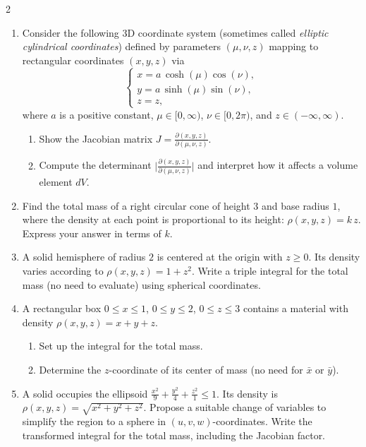 \begin{multicols}{2}
\begin{enumerate}
\item Consider the following 3D coordinate system (sometimes called \emph{elliptic cylindrical coordinates}) defined by parameters \((\mu,\nu,z)\) mapping to rectangular coordinates \((x,y,z)\) via
\[
\begin{cases}
x = a\,\cosh(\mu)\cos(\nu),\\
y = a\,\sinh(\mu)\sin(\nu),\\
z = z,
\end{cases}
\]
where \(a\) is a positive constant, \(\mu \in [0,\infty)\), \(\nu \in [0,2\pi)\), and \(z\in(-\infty,\infty)\).

\begin{enumerate}
\item Show the Jacobian matrix \(\displaystyle J = \frac{\partial(x,y,z)}{\partial(\mu,\nu,z)}\).
\item Compute the determinant \(\bigl|\tfrac{\partial(x,y,z)}{\partial(\mu,\nu,z)}\bigr|\) and interpret how it affects a volume element \(dV\).
\end{enumerate}

\item 
Find the total mass of a right circular cone of height $3$ and base radius $1$, where the density at each point is proportional to its height: $\rho(x,y,z) = k \,z$. Express your answer in terms of $k$.

\item 
A solid hemisphere of radius $2$ is centered at the origin with $z \ge 0$. Its density varies according to $\rho(x,y,z)=1+z^2$. Write a triple integral for the total mass (no need to evaluate) using spherical coordinates.

\item 
A rectangular box $0 \le x \le 1$, $0 \le y \le 2$, $0 \le z \le 3$ contains a material with density $\rho(x,y,z)=x+y+z$.  
\begin{enumerate}
   \item Set up the integral for the total mass.  
   \item Determine the $z$-coordinate of its center of mass (no need for $\bar{x}$ or $\bar{y}$).
\end{enumerate}

\item 
A solid occupies the ellipsoid $\frac{x^2}{9} + \frac{y^2}{4} + \frac{z^2}{1} \le 1$. Its density is $\rho(x,y,z) = \sqrt{x^2 + y^2 + z^2}$.  Propose a suitable change of variables to simplify the region to a sphere in $(u,v,w)$-coordinates. Write the transformed integral for the total mass, including the Jacobian factor.


\end{enumerate}
\end{multicols}
